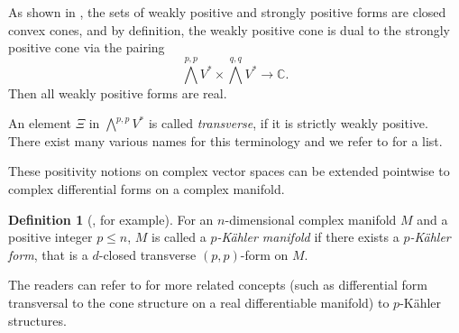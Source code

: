 \documentclass[12pt]{amsart}
\numberwithin{equation}{section}
\theoremstyle{definition}
\theoremstyle{definition}
\newtheorem{definition}  [theorem]     {Definition}
\theoremstyle{definition}
\renewcommand{\1}{\mathsf{1}}
\renewcommand{\>}{\rightarrow}
\theoremstyle{plain} %
\theoremstyle{plain} %
\theoremstyle{plain} %
\begin{document}
As shown in \cite[Chapter III, \S\,1.A]{Dm12}, the sets of weakly positive and strongly positive forms are closed convex cones,
	and by definition, the weakly positive cone is dual to the strongly positive cone via the pairing
	$$\bigwedge^{p,p}V^*\times \bigwedge^{q,q}V^*\longrightarrow \mathbb{C}.$$
	Then all weakly positive forms are real.
	
An element $\Xi$ in $\bigwedge^{p,p}V^*$ is called  \textit{transverse}, if
	it is strictly weakly positive. There exist many various names for this
	terminology and we refer to \cite[Appendix]{AB91} for a list.
	
	These positivity notions on complex vector spaces can be extended pointwise to
	complex differential forms on a complex manifold.
	\begin{definition}[{\cite[Definition $1.11$]{AA87}}, for example]\label{pkf}\rm
		For an $n$-dimensional complex manifold $M$ and a positive integer $p\leq n$, $M$ is called a  \textit{$p$-K\"ahler manifold}
		if there exists a  \textit{$p$-K\"ahler form}, that is a $d$-closed transverse $(p,p)$-form on $M$.
	\end{definition}
	
	The readers can refer to \cite{Su76} for more related concepts (such as differential form transversal to the cone structure on a real differentiable manifold) to $p$-K\"ahler structures.
	
	
	
\end{document}
